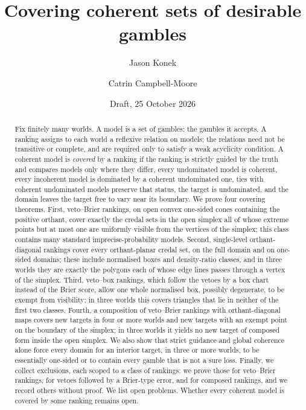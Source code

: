 \documentclass[11pt]{article}
\title{Covering coherent sets of desirable gambles}
\author{Jason Konek \and Catrin Campbell-Moore}
\date{Draft, 25 October 2026}
\theoremstyle{plain}
\theoremstyle{definition}
\theoremstyle{remark}
\begin{document}
\maketitle

\begin{abstract}
Fix finitely many worlds. A model is a set of gambles: the gambles it accepts. A ranking
assigns to each world a reflexive relation on models; the relations need not be transitive
or complete, and are required only to satisfy a weak acyclicity condition. A coherent
model is \emph{covered} by a ranking if the ranking is strictly guided by the truth and
compares models only where they differ, every undominated model is coherent, every
incoherent model is dominated by a coherent undominated one, ties with coherent
undominated models preserve that status, the target is undominated, and the domain leaves
the target free to vary near its boundary. We prove four covering theorems. First,
veto--Brier rankings, on open convex one-sided cones containing the positive orthant,
cover exactly the credal sets in the open simplex all of whose extreme points but at most
one are uniformly visible from the vertices of the simplex; this class contains many
standard imprecise-probability models. Second, single-level orthant-diagonal rankings
cover every orthant-planar credal set, on the full domain and on one-sided domains; these
include normalised boxes and density-ratio classes, and in three worlds they are exactly
the polygons each of whose edge lines passes through a vertex of the simplex. Third,
veto--box rankings, which follow the vetoes by a box chart instead of the Brier score,
allow one whole normalised box, possibly degenerate, to be exempt from visibility; in
three worlds this covers triangles that lie in neither of the first two classes. Fourth,
a composition of veto--Brier rankings with orthant-diagonal maps covers new targets in four
or more worlds and new targets with an exempt point on the boundary of the simplex; in
three worlds it yields no new target of composed form inside the open simplex. We also
show that strict guidance and global coherence alone force every domain for an interior
target, in three or more worlds, to be essentially one-sided or to contain every gamble
that is not a sure loss. Finally, we collect exclusions, each scoped to a class of
rankings: we prove those for veto--Brier rankings, for vetoes followed by a Brier-type
error, and for composed rankings, and we record others without proof. We list open
problems. Whether every coherent model is covered by some ranking remains open.
\end{abstract}
\end{document}
